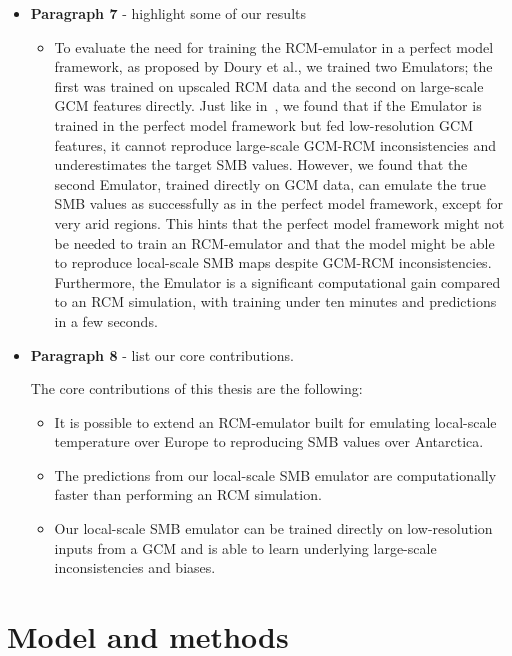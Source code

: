 \documentclass[a4paper,11pt,oneside]{report}
\begin{document}
\begin{itemize}
    \item \textbf{Paragraph 7} - highlight some of our results
    \begin{itemize}
        \item To evaluate the need for training the RCM-emulator in a perfect model framework, as proposed by Doury et al., we trained two Emulators; the first was trained on upscaled RCM data and the second on large-scale GCM features directly. Just like in~\cite{Doury}, we found that if the Emulator is trained in the perfect model framework but fed low-resolution GCM features, it cannot reproduce large-scale GCM-RCM inconsistencies and underestimates the target SMB values. However, we found that the second Emulator, trained directly on GCM data, can emulate the true SMB values as successfully as in the perfect model framework, except for very arid regions. This hints that the perfect model framework might not be needed to train an RCM-emulator and that the model might be able to reproduce local-scale SMB maps despite GCM-RCM inconsistencies. Furthermore, the Emulator is a significant computational gain compared to an RCM simulation, with training under ten minutes and predictions in a few seconds. 
    \end{itemize}
    \item \textbf{Paragraph 8} - list our core contributions. 
    
    
    The core contributions of this thesis are the following: 
    \begin{itemize}
        \item It is possible to extend an RCM-emulator built for emulating local-scale temperature over Europe to reproducing SMB values over Antarctica.
        \item The predictions from our local-scale SMB emulator are computationally faster than performing an RCM simulation. 
        \item Our local-scale SMB emulator can be trained directly on low-resolution inputs from a GCM and is able to learn underlying large-scale inconsistencies and biases.
    \end{itemize}

\end{itemize}



\chapter{Model and methods}
\end{document}
